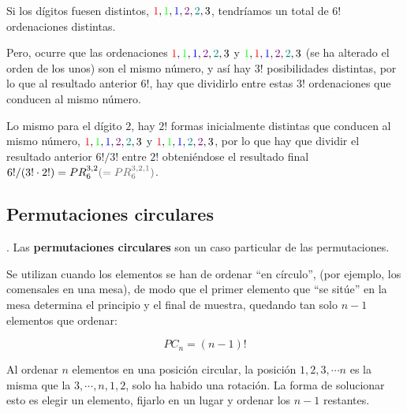 \begin{small}
Si los dígitos fuesen distintos, $\textcolor{red}{1}, \textcolor{green}{1}, \textcolor{blue}{1}, \textcolor{violet}{2}, \textcolor{teal}{2}, 3$, tendríamos un total de $6!$ ordenaciones distintas.

Pero, ocurre que las ordenaciones  $\textcolor{red}{1}, \textcolor{green}{1}, \textcolor{blue}{1}, \textcolor{violet}{2}, \textcolor{teal}{2}, 3$ y  $\textcolor{green}{1}, \textcolor{red}{1}, \textcolor{blue}{1}, \textcolor{violet}{2}, \textcolor{teal}{2}, 3$ (se ha alterado el orden de los unos) son el mismo número, y así hay $3!$ posibilidades distintas, por lo que al resultado anterior $6!$, hay que dividirlo entre estas $3!$ ordenaciones que conducen al mismo número. 

Lo mismo para el dígito $2$, hay $2!$ formas inicialmente distintas que conducen al mismo número,  $\textcolor{red}{1}, \textcolor{green}{1}, \textcolor{blue}{1}, \textcolor{violet}{2}, \textcolor{teal}{2}, 3$ y  $\textcolor{red}{1}, \textcolor{green}{1}, \textcolor{blue}{1}, \textcolor{teal}{2}, \textcolor{violet}{2}, 3$, por lo que hay que dividir el resultado anterior $6!/3!$ entre $2!$ obteniéndose el resultado final $6!/(3!\cdot 2!)=PR_6^{3,2}\textcolor{gris}{(=PR_6^{3,2,1})}$.
\end{small}

\subsection{Permutaciones circulares}

\begin{definition}
	. Las \textbf{permutaciones circulares} son un caso particular de las permutaciones.

\vspace{2mm} Se utilizan cuando los elementos se han de ordenar ``en círculo'', (por ejemplo, los comensales en una mesa), de modo que el primer elemento que ``se sitúe'' en la mesa determina el principio y el final de muestra, quedando tan solo $n-1$ elementos que ordenar:	
 
 $$ PC_n=(n-1)!$$
\end{definition}

\begin{small} Al ordenar $n$ elementos en una posición circular, la posición $1,2,3,\cdots n$ es la misma que la $3, \cdots ,n, 1, 2$, solo ha habido una rotación. La forma de solucionar esto es elegir un elemento, fijarlo en un lugar y ordenar los $n-1$ restantes. \end{small}

